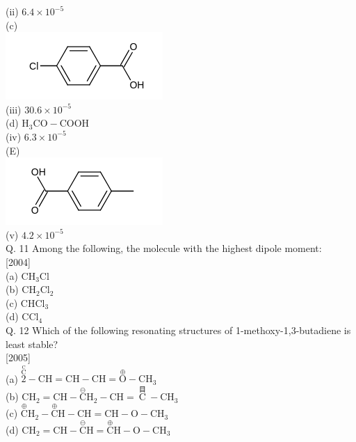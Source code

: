 \documentclass[10pt]{article}
\begin{document}
(ii) $6.4 \times 10^{-5}$\\
(c)\\
\includegraphics{smile-b8f60d76b82aa492868566bb51ddbbb2f3312ca5}\\
(iii) $30.6 \times 10^{-5}$\\
(d) $\mathrm{H}_{3} \mathrm{CO}-\mathrm{COOH}$\\
(iv) $6.3 \times 10^{-5}$\\
(E)\\
\includegraphics{smile-ef528fe23d24d26840d32ebfbc7356f7e6cd5dfc}\\
(v) $4.2 \times 10^{-5}$\\
Q. 11 Among the following, the molecule with the highest dipole moment:\\[0pt]
[2004]\\
(a) $\mathrm{CH}_{3} \mathrm{Cl}$\\
(b) $\mathrm{CH}_{2} \mathrm{Cl}_{2}$\\
(c) $\mathrm{CHCl}_{3}$\\
(d) $\mathrm{CCl}_{4}$\\
Q. 12 Which of the following resonating structures of 1-methoxy-1,3-butadiene is least stable?\\[0pt]
[2005]\\
(a) $\stackrel{\stackrel{\mathrm{C}}{\mathrm{C}}}{2}-\mathrm{CH}=\mathrm{CH}-\mathrm{CH}=\stackrel{\oplus}{\mathrm{O}}-\mathrm{CH}_{3}$\\
(b) $\mathrm{CH}_{2}=\mathrm{CH}-\stackrel{\ominus}{\mathrm{C}} \mathrm{H}_{2}-\mathrm{CH}=\stackrel{\text { 目 }}{\mathrm{C}}-\mathrm{CH}_{3}$\\
(c) $\stackrel{\oplus}{\mathrm{C}} \mathrm{H}_{2}-\stackrel{\oplus}{\mathrm{C}} \mathrm{H}-\mathrm{CH}=\mathrm{CH}-\mathrm{O}-\mathrm{CH}_{3}$\\
(d) $\mathrm{CH}_{2}=\mathrm{CH}-\stackrel{\ominus}{\mathrm{C}} \mathrm{H}=\stackrel{\oplus}{\mathrm{C}} \mathrm{H}-\mathrm{O}-\mathrm{CH}_{3}$\\
\end{document}
